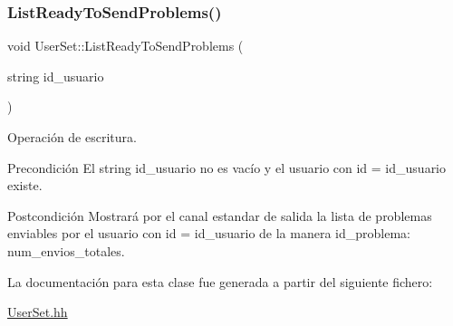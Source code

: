 \subsubsection{\texorpdfstring{List\+Ready\+To\+Send\+Problems()}{ListReadyToSendProblems()}}
{\footnotesize\ttfamily void User\+Set\+::\+List\+Ready\+To\+Send\+Problems (\begin{DoxyParamCaption}\item[{string}]{id\+\_\+usuario }\end{DoxyParamCaption})}



Operación de escritura. 

\begin{DoxyPrecond}{Precondición}
El string id\+\_\+usuario no es vacío y el usuario con id = id\+\_\+usuario existe. 
\end{DoxyPrecond}
\begin{DoxyPostcond}{Postcondición}
Mostrará por el canal estandar de salida la lista de problemas enviables por el usuario con id = id\+\_\+usuario de la manera id\+\_\+problema\+: num\+\_\+envios\+\_\+totales. 
\end{DoxyPostcond}


La documentación para esta clase fue generada a partir del siguiente fichero\+:\begin{DoxyCompactItemize}
\item 
\mbox{\hyperlink{_user_set_8hh}{User\+Set.\+hh}}\end{DoxyCompactItemize}
